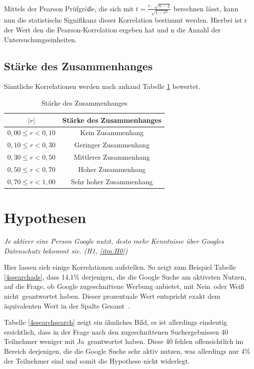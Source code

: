 Mittels der Pearson Prüfgröße, die sich mit $t = \frac{r \cdot \sqrt[]{n - 2}}{\sqrt[]{1 - r^2}}$ berechnen lässt, kann nun die statistische Signifikanz dieser Korrelation bestimmt werden. Hierbei ist r der Wert den die Pearson-Korrelation ergeben hat und n die Anzahl der Untersuchungseinheiten.

\subsection{Stärke des Zusammenhanges}
Sämtliche Korrelationen werden nach \citet{statistikeinfuehrung} anhand Tabelle \ref{correlationrelevance} bewertet.

\begin{table}
	\begin{tabular}[]{ c | c }
	$|r|$ & Stärke des Zusammenhanges\\\hline\hline
	$0,00 \leq r < 0,10$ & Kein Zusammenhang\\\hline
	$0,10 \leq r < 0,30$ & Geringer Zusammenhang\\\hline
	$0,30 \leq r < 0,50$ & Mittlerer Zusammenhang\\\hline
	$0,50 \leq r < 0,70$ & Hoher Zusammenhang\\\hline
	$0,70 \leq r < 1,00$ & Sehr hoher Zusammenhang\\\hline
	\end{tabular}
	\caption{Stärke des Zusammenhanges}\label{correlationrelevance}
\end{table}

\section{Hypothesen}
\textit{Je aktiver eine Person Google nutzt, desto mehr Kenntnisse über Googles Datenschutz bekommt sie. (H1, \ref{itm:H0})}

Hier lassen sich einige Korrelationen aufstellen. So zeigt zum Beispiel Tabelle \ref{4ssearchads}, dass 14,1\% derjenigen, die die Google Suche am aktivsten Nutzen, auf die Frage, ob Google zugeschnittene Werbung anbietet, mit \glqq Nein\grqq\ oder \glqq Weiß nicht\grqq\ geantwortet haben. Dieser prozentuale Wert entspricht exakt dem äquivalenten Wert in der Spalte \glqq Gesamt\grqq\ .

Tabelle \ref{4ssearchsearch} zeigt ein ähnliches Bild, es ist allerdings eindeutig ersichtlich, dass in der Frage nach den zugeschnittenen Suchergebnissen 40 Teilnehmer weniger mit \grqq Ja\glqq\ geantwortet haben. Diese 40 fehlen offensichtlich im Bereich derjenigen, die die Google Suche sehr aktiv nutzen, was allerdings nur 4\% der Teilnehmer sind und somit die Hypothese nicht widerlegt.

